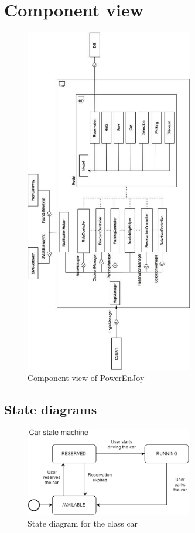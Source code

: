 \clearpage
\section{Component view}
\begin{figure}[h]
	\centering
	\includegraphics[height=15.2cm,keepaspectratio]{figures/component_view.eps}
	\caption{Component view of PowerEnJoy}
	\label{fig:component_view}
\end{figure}

\clearpage
\subsection{State diagrams}
\begin{figure}[h]
	\centering
	\includegraphics[width=7.3cm,keepaspectratio]{figures/car_state_diagram.eps}
	\caption{State diagram for the class car}
	\label{fig:car_state_diagram}
\end{figure}

